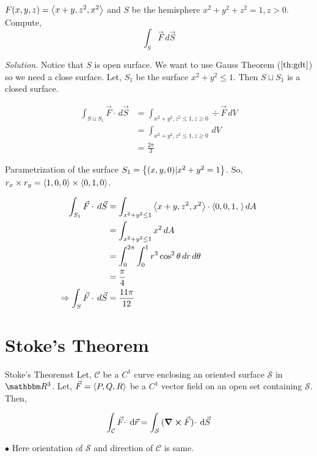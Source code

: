 \documentclass[../Analysis-3]{subfiles}
\begin{document}
\begin{Eg}{}{}
    $F (x,y,z) = \left\langle {x+y}, {z^2,x^2} \right\rangle$ and $S$ be the hemisphere $x^2+y^2+z^2 = 1, z>0$. Compute,
    \[\int_{S} \vec{F} \,d \vec{S}\]

    \textit{Solution.} Notice that $S$ is open surface. We want to  use Gauss Theorem ($\ref{th:gdt}$) so we need a close surface. Let, $S_1$ be the surface $x^2 +y^2 \le 1$. Then $S \sqcup S_1$ is a closed surface.

    \begin{align*}
        \int_{S \sqcup S_1} \vec{F}\cdot \,d \vec{S} & = \int_{x^2+y^2,z^2 \le 1, z \ge 0} \div \vec{F} \,dV \\
                                                     & = \int_{x^2+y^2,z^2 \le 1, z \ge 0}\,dV               \\
                                                     & = \frac{2\pi}{3}
    \end{align*}

    Parametrization of the surface $S_1 =\qty{(x,y,0) | x^2+y^2 = 1}$. So, $r_x \times r_y = \left\langle {1,0}, {0} \right\rangle \times \left\langle {0,1}, {0} \right\rangle$.

    \begin{align*}
        \int_{S_1} \vec{F} \cdot \,d \vec{S}           & = \int_{x^2+y^2 \le 1} \left\langle {x+y}, {z^2,x^2} \right\rangle \cdot \left\langle {0,0,1}, {\,} \right\rangle dA \\
                                                       & = \int_{x^2+y^2 \le 1} x^2 \,dA                                  \\
                                                       & = \int_{0}^{2\pi} \int_{0}^{1} r^3 \cos^2 \theta \,dr \,d\theta  \\
                                                       & = \frac{\pi}{4}                                                  \\
        \Rightarrow \int_{S} \vec{F} \cdot \,d \vec{S} & = \frac{11\pi}{12}
    \end{align*}
\end{Eg}

\section{Stoke's Theorem}
\begin{Thm}{Stoke's Theorem}{st}
    Let, $\mathcal{C}$ be a $C^1$ curve enclosing an oriented surface $\mathcal{S}$ in $\R^3$. Let,  $\vec{F} = \left\langle {P,Q}, {R} \right\rangle$ be a $C^1$ vector field on an open set containing $\mathcal{S}$. Then,

    \small \[\int_{\mathcal{C}} {\vec{F} \cdot } \hspace{0.1cm} \dd {\vec{r}} = \int_{\mathcal{S}} {(\curl \vec{F}) \cdot} \hspace{0.1cm} \dd {\vec{S}}  \]

    $\bullet$ Here orientation of $\mathcal{S}$ and direction of $\mathcal{C}$ is same.
\end{Thm}
\end{document}
